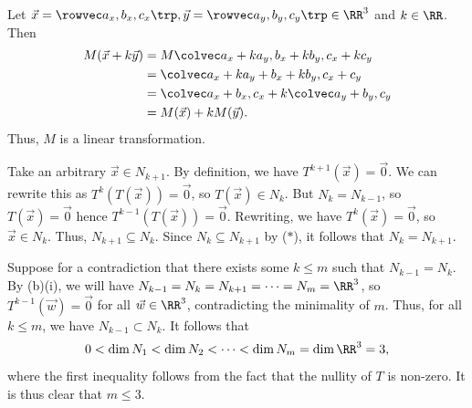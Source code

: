 \begin{solution}
    \begin{ppart}
        Let $\vec x = \cveciiix{a_x}{b_x}{c_x}, \vec y = \cveciiix{a_y}{b_y}{c_y} \in \RR^3$ and $k \in \RR$. Then
        \begin{align*}
            M(\vec x + k \vec y) &= M\cveciii{a_x + ka_y}{b_x + kb_y}{c_x + kc_y}\\
            &= \cvecii{a_x + ka_y + b_x + kb_y}{c_x + c_y}\\
            &= \cvecii{a_x + b_x}{c_x} + k\cvecii{a_y + b_y}{c_y}\\
            &= M(\vec x) + k M(\vec y).
        \end{align*}
        Thus, $M$ is a linear transformation.
    \end{ppart}
    \begin{ppart}
        \begin{psubpart}
            Take an arbitrary $\vec x \in N_{k+1}$. By definition, we have $T^{k+1}(\vec x) = \vec 0$. We can rewrite this as $T^k(T(\vec x)) = \vec 0$, so $T(\vec x) \in N_k$. But $N_k = N_{k-1}$, so $T(\vec x) = \vec 0$ hence $T^{k-1}(T(\vec x)) = \vec 0$. Rewriting, we have $T^k(\vec x) = \vec 0$, so $\vec x \in N_k$. Thus, $N_{k+1} \subseteq N_k$. Since $N_k \subseteq N_{k+1}$ by ($\ast$), it follows that $N_k = N_{k+1}$.
        \end{psubpart}
        \begin{psubpart}
            Suppose for a contradiction that there exists some $k \leq m$ such that $N_{k-1} = N_k$. By (b)(i), we will have $N_{k-1} = N_k = N_{k+1} = \dots = N_m = \RR^3$, so $T^{k-1}(\vec w) = \vec 0$ for all $\vec w \in \RR^3$, contradicting the minimality of $m$. Thus, for all $k \leq m$, we have $N_{k-1} \subset N_k$. It follows that \[0 < \dim N_1 < \dim N_2 < \dots < \dim N_m = \dim \RR^3 = 3,\] where the first inequality follows from the fact that the nullity of $T$ is non-zero. It is thus clear that $m \leq 3$.
        \end{psubpart}
    \end{ppart}
\end{solution}

